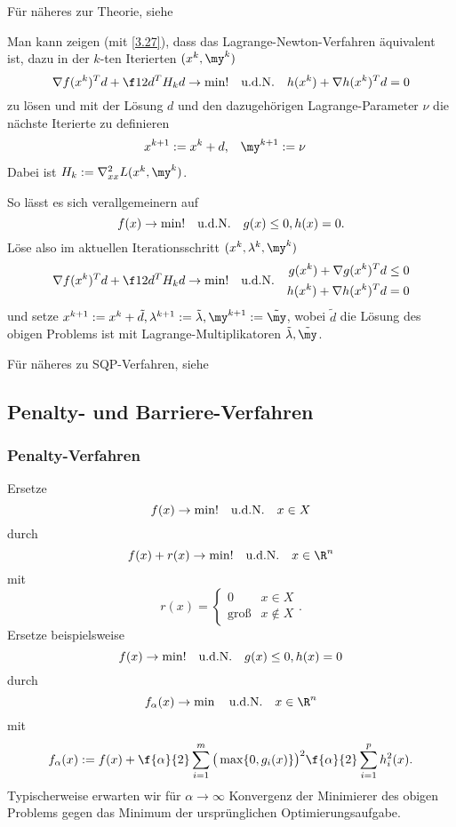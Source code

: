 Für näheres zur Theorie, siehe \cite{ulbrich12}

Man kann zeigen (mit \ref{3.27}), dass das Lagrange-Newton-Verfahren äquivalent ist, dazu in der $k$-ten Iterierten $(x^k, \my^k)$
\[
	\nabla f(x^k)^T d + \f 12 d^T H_k d \to\min!
	\udN h(x^k) + \nabla h(x^k)^T d = 0
\]
zu lösen und mit der Lösung $d$ und den dazugehörigen Lagrange-Parameter $\nu$ die nächste Iterierte zu definieren
\begin{align*}
	x^{k+1} &:= x^k + d, &
	\my^{k+1} &:= \nu
\end{align*}
Dabei ist $H_k := \nabla_{xx}^2 L(x^k, \my^k)$.

So lässt es sich verallgemeinern auf
\[
	f(x) \to \min! \quad\text{u.d.N.}\quad g(x) \le 0, h(x) = 0.
\]
Löse also im aktuellen Iterationsschritt $(x^k, \lambda^k, \my^k)$
\[
	\nabla f(x^k)^T d + \f 12 d^T H_k d \to \min!
	\udN
	\begin{aligned}
		g(x^k) + \nabla g(x^k)^T d & \le 0 \\
		h(x^k) + \nabla h(x^k)^T d & = 0
	\end{aligned}
\]
und setze $x^{k+1} := x^k + \tilde d, \lambda^{k+1} := \tilde \lambda, \my^{k+1} := \tilde \my$, wobei $\tilde d$ die Lösung des obigen Problems ist mit Lagrange-Multiplikatoren $\tilde \lambda, \tilde \my$.

Für näheres zu SQP-Verfahren, siehe \cite{ulbrich12}

\subsection{Penalty- und Barriere-Verfahren}

\subsubsection{Penalty-Verfahren}

Ersetze
\[
	f(x) \to \min! \quad\text{u.d.N.}\quad x\in X
\]
durch
\[
	f(x) + r(x) \to \min! \udN x \in \R^n
\]
mit
\[
	r(x) = \begin{cases}
		0 & x \in X \\
		\text{groß} & x \not\in X
	\end{cases}.
\]
Ersetze beispielsweise
\[
	f(x) \to \min! \quad\text{u.d.N.}\quad g(x) \le 0, h(x) = 0
\]
durch
\[
	f_\alpha(x) \to \min \udN x \in \R^n
\]
mit
\[
	f_\alpha(x) := f(x) + \f{\alpha}{2} \sum_{i=1}^m \big(\max \{ 0, g_i(x) \}\big)^2 \f{\alpha}{2} \sum_{i=1}^p h_i^2 (x).
\]
Typischerweise erwarten wir für $\alpha \to \infty$ Konvergenz der Minimierer des obigen Problems gegen das Minimum der ursprünglichen Optimierungsaufgabe.

